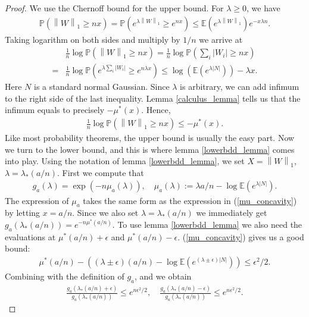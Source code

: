 \documentclass[10pt]{article}
\newcommand{\e}{\mathbb{E}}
\newcommand{\p}{\mathbb{P}}
\newcommand{\norm}[1]{\left\lVert#1\right\rVert}
\newenvironment{Proof of lemma}{\noindent{\bf Proof of Lemma}}{\hfill$\Box$\newline}
\newenvironment{Proof of claim}{\noindent{\bf Proof of claim}}{\hfill$\Box$\newline}
\newenvironment{Proof of theorem}{\noindent{\bf Proof of Theorem}}{\hfill\scriptsize{$\Box$}\newline}
\newenvironment{Proof of theorems}{\noindent{\bf Proof of Theorems}}{\hfill$\Box$\newline}
\newenvironment{Proof of proposition}{\noindent{\bf Proof of Proposition}}{\hfill$\Box$\newline}
\newenvironment{Proof of propositions}{\noindent{\bf Proof of Propositions}}{\hfill$\Box$\newline}
\newenvironment{Proof of exercise}{\noindent{\it Proof of Exercise:}}{\hfill$\Box$}
\numberwithin{equation}{section}
\begin{document}
\begin{proof}
    We use the Chernoff bound for the upper bound. For $\lambda \geq 0$, we have 
    \begin{align}
        \p(\norm{W}_1 \geq nx) =\p(e^{\lambda \norm{W}_1} \geq e^{nx})\leq \e(e^{\lambda \norm{W}_1})e^{-x \lambda n}.
    \end{align}
    Taking logarithm on both sides and multiply by $1/n$ we arrive at
    \begin{align}
        &\frac{1}{n}\log \p(\norm{W}_1 \geq nx) =  \frac{1}{n} \log \p(\sum_i |W_i| \geq nx) \nonumber \\
        = & \frac{1}{n} \log \p(e^{\lambda \sum_i |W_i|} \geq e^{n\lambda x})
        \leq \log  (\e(e^{\lambda |N|})) -\lambda x.
    \end{align}
    Here $N$ is a standard normal Gaussian. Since $\lambda$ is arbitrary, we can add infimum to the right side of the last inequality. Lemma \ref{calculus_lemma} tells us that the infimum equals to precisely $-\mu^*(x)$. Hence,
    \begin{align}
        \frac{1}{n}\log \p(\norm{W}_1 \geq nx) \leq -\mu^*(x).
    \end{align}
    Like most probability theorems, the upper bound is usually the easy part. Now we turn to the lower bound, and this is where lemma \ref{lowerbdd_lemma} comes into play. Using the notation of lemma \ref{lowerbdd_lemma}, we set $X = \norm{W}_1$, $\lambda = \lambda_*(a/n)$. First we compute that
    \begin{align}
        g_a (\lambda) = \exp(-n \mu_a (\lambda)), \quad \mu_a(\lambda) := \lambda a/n - \log \e (e^{\lambda |N|}).
    \end{align}
    The expression of $\mu_a$ takes the same form as the expression in (\ref{mu_concavity}) by letting $x = a/n$. Since we also set $\lambda = \lambda_*(a/n)$ we immediately get $g_a(\lambda_*(a/n)) = e^{-n\mu^*(a/n)}$. To use lemma \ref{lowerbdd_lemma} we also need the evaluations at $\mu^*(a/n)+\epsilon$ and $\mu^*(a/n)-\epsilon$. (\ref{mu_concavity}) gives us a good bound:
    \begin{align}
        \mu^*(a/n) - ((\lambda \pm \epsilon)(a/n)-\log\e (e^{(\lambda \pm \epsilon) |N|})) \leq \epsilon^2/2.
    \end{align}
    Combining with the definition of $g_a$, and we obtain
    \begin{align} \label{ga_drift_bound}
        \frac{g_a(\lambda_*(a/n)+\epsilon)}{g_a(\lambda_*(a/n))} \leq e^{n\epsilon^2/2}, \quad \frac{g_a(\lambda_*(a/n)-\epsilon)}{g_a(\lambda_*(a/n))} \leq e^{n\epsilon^2/2}.

\end{align}
\end{proof}
\end{document}
